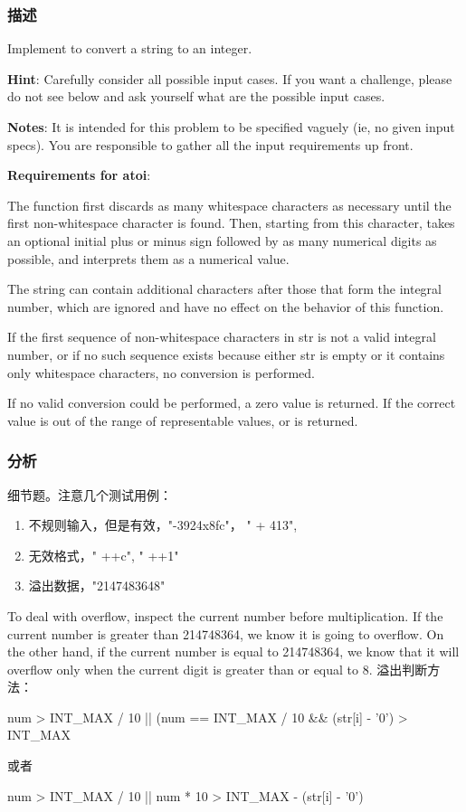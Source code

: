 \subsubsection{描述}
Implement  to convert a string to an integer.

\textbf{Hint}: Carefully consider all possible input cases. If you want a challenge, please do not see below and ask yourself what are the possible input cases.

\textbf{Notes}: It is intended for this problem to be specified vaguely (ie, no given input specs). You are responsible to gather all the input requirements up front.

\textbf{Requirements for atoi}:

The function first discards as many whitespace characters as necessary until the first non-whitespace character is found. Then, starting from this character, takes an optional initial plus or minus sign followed by as many numerical digits as possible, and interprets them as a numerical value.

The string can contain additional characters after those that form the integral number, which are ignored and have no effect on the behavior of this function.

If the first sequence of non-whitespace characters in str is not a valid integral number, or if no such sequence exists because either str is empty or it contains only whitespace characters, no conversion is performed.

If no valid conversion could be performed, a zero value is returned. If the correct value is out of the range of representable values,  or  is returned.

\subsubsection{分析}
细节题。注意几个测试用例：
\begin{enumerate}
\item 不规则输入，但是有效，"-3924x8fc"， "  +  413",
\item 无效格式，" ++c", " ++1"
\item 溢出数据，"2147483648"
\end{enumerate}

To deal with overflow, inspect the current number before multiplication. If the current number is greater than 214748364, we know it is going to overflow. On the other hand, if the current number is equal to 214748364, we know that it will overflow only when the current digit is greater than or equal to 8.
溢出判断方法：
\begin{Code}
num > INT_MAX / 10 || (num == INT_MAX / 10 && (str[i] - '0') > INT_MAX %
\end{Code}
或者
\begin{Code}
num > INT_MAX / 10 || num * 10 > INT_MAX - (str[i] - '0')
\end{Code}

